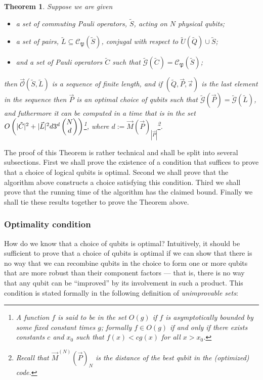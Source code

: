 \documentclass[twocolumn,showpacs,preprintnumbers,amsmath,amssymb,nofootinbib,pra,floatfix]{revtex4-1}
\newtheorem{theorem}{Theorem}
\newcommand{\lst}{\vec}
\newcommand{\set}{\tilde}
\newcommand{\genfun}{\tilde{\mathcal{G}}}
\newcommand{\pauligroup}{\mathfrak{P}}
\newcommand{\centralizer}{\mathcal{C}}
\newcommand{\optimizer}{\lst{\mathcal{O}}}
\begin{document}
\begin{theorem}
\label{theorem:optimization procedure}
Suppose we are given
\begin{itemize}
\item a set of commuting Pauli operators, $\set S$, acting on $N$ physical qubits;
\item a set of pairs, $\set L\subseteq\centralizer_\pauligroup(\set S)$, conjugal with respect to $\set U(\set Q)\cup\set S$;
\item and a set of Pauli operators $\set C$ such that $\genfun(\set C)=\centralizer_\pauligroup(\set S)$;
\end{itemize}
then $\optimizer(\set S,\set L)$ is a sequence of finite length, and if $(\set Q,\lst P,\lst s)$ is the last element in the sequence then $\lst P$ is an optimal choice of qubits such that $\genfun(\lst P)=\genfun(\set L)$, and futhermore it can be computed in a time that is in the set $O\paren{|\set C|^2+|\lst L|^2d3^d\choose{N}{d}}$\footnote{A function $f$ is said to be in the set $O(g)$ if $f$ is asymptotically bounded by some fixed constant times $g$;  formally $f\in O(g)$ if and only if there exists constants $c$ and $x_0$ such that $f(x)<c g(x)$ for all $x>x_0$.}, where $d:=\lst M(\lst P)_{|\lst P|}$\footnote{Recall that $\lst M^{(N)}(\lst P)_N$ is the distance of the best qubit in the (optimized) code.}.
\end{theorem}

The proof of this Theorem is rather technical and shall be split into several subsections.  First we shall prove the existence of a condition that suffices to prove that a choice of logical qubits is optimal.   Second we shall prove that the algorithm above constructs a choice satisfying this condition.  Third we shall prove that the running time of the algorithm has the claimed bound.  Finally we shall tie these results together to prove the Theorem above.

\subsubsection{Optimality condition}

\label{optimal-generators}

How do we know that a choice of qubits is optimal?  Intuitively, it should be sufficient to prove that a choice of qubits is optimal if we can show that there is no way that we can recombine qubits in the choice to form one or more qubits that are more robust than their component factors --- that is, there is no way that any qubit can be ``improved'' by its involvement in such a product.  This condition is stated formally in the following definition of \emph{unimprovable sets}:
\end{document}
